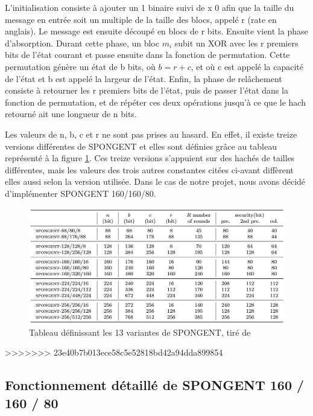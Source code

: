 			 	L'initialisation consiste à ajouter un 1 binaire suivi de x 0 afin que la
			taille du message en entrée soit un multiple de la taille des blocs, appelé
			r (rate en anglais). Le message est ensuite découpé en blocs de r bits.
			Ensuite vient la phase d'absorption. Durant cette phase, un bloc $m_{i}$
			subit un XOR avec les r premiers bits de l'état courant et passe ensuite
			dans la fonction de permutation. Cette permutation génère un état de b
			bits, où $b = r + c$, et où c est appelé la capacité de l'état et b est
			appelé la largeur de l'état. Enfin, la phase de relâchement consiste à
			retourner les r premiers bits de l'état, puis de passer l'état dans la
			fonction de permutation, et de répéter ces deux opérations jusqu'à ce que
			le hach retourné ait une longueur de n bits.

				Les valeurs de n, b, c et r ne sont pas prises au hasard. En effet, il
			existe treize versions différentes de SPONGENT et elles sont définies grâce
			au tableau représenté à la figure \ref{variantesSpongent}. Ces treize
			versions s'appuient sur des hachés de tailles différentes, mais les valeurs
			des trois autres constantes citées ci-avant diffèrent elles aussi selon la
			version utilisée. Dans le cas de notre projet, nous avons décidé
			d'implémenter SPONGENT 160/160/80.

			\begin{figure}[!h]
				\centering
				\includegraphics[width=\textwidth]{imgs/Spongent/varianteSpongent.png}
				\caption{Tableau définissant  les 13 variantes de SPONGENT, tiré de \cite{6275435}}
				\label{variantesSpongent}
	 		\end{figure}
>>>>>>> 23e40b7b013ece58c5e52818bd42a94dda899854

		\subsection{Fonctionnement détaillé de SPONGENT 160 / 160 / 80}


